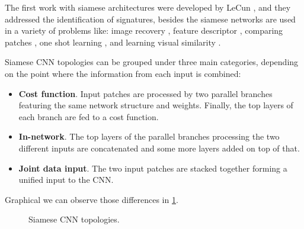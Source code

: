 The first work with siamese architectures were developed by LeCun \cite{siamLecun}, \cite{siameLecun2} and they addressed the identification of signatures, besides the siamese networks are used in a variety of problems like: image recovery \cite{siameseQuer}, feature descriptor \cite{siameDescri}, comparing patches \cite{patch1}, one shot learning \cite{siameseOne}, and learning visual similarity \cite{siamesSImi}. 

Siamese CNN topologies can be grouped under three main categories, depending on the point where the information from each input is combined:

\begin{itemize}

\item \textbf{Cost function}. Input patches are processed by two parallel branches featuring the same network structure and weights. Finally, the top layers of each branch are fed to a cost function.

\item \textbf{In-network}. The top layers of the parallel branches processing the two different inputs are concatenated and some more layers added on top of that.

\item \textbf{Joint data input}. The two input patches are stacked together forming a unified input to the CNN.

\end{itemize}

Graphical we can observe those differences in \ref{siamese2Data1}.
\begin{figure}[H]
		
\centering


\caption{Siamese CNN topologies.}
\label{siamese2Data1}
\end{figure}


